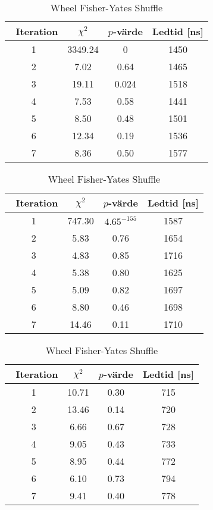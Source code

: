 \begin{table}[H]
	\vspace{2em}

	\begin{subtable}[h]{0.45\textwidth}
		\centering
		\caption{\gls{soc} Pile Shuffle}
		\label{tab:soc}
		\begin{tabular}{c|c|c|c}
			$\phantom{\bigg|}$ Iteration & $\chi^2$  & \(p\)-värde & Ledtid [ns]

			\\ \hline \hline
			1 & 3349.24 & 0 & 1450 
			\\ \hline
			2 & 7.02 & 0.64 & 1465 
			\\ \hline
			3 & 19.11 & 0.024 & 1518
			\\ \hline
			4 & 7.53 & 0.58 & 1441 
			\\ \hline
			5 & 8.50 & 0.48 & 1501 
			\\ \hline
			6 & 12.34 & 0.19 & 1536 
			\\ \hline
			7 & 8.36 & 0.50 & 1577 
		\end{tabular}
	\end{subtable}
	\hfill
	\begin{subtable}[h]{0.45\textwidth}
		\centering
		\caption{Ten Pile Shuffle}
		\label{tab:ten}
		\begin{tabular}{c|c|c|c}
			$\phantom{\bigg|}$ Iteration & $\chi^2$  & \(p\)-värde & Ledtid [ns]

			\\ \hline \hline
			1 & 747.30 & $4.65^{-155}$ & 1587 
			\\ \hline
			2 & 5.83 & 0.76 & 1654 
			\\ \hline
			3 & 4.83 & 0.85 & 1716
			\\ \hline
			4 & 5.38 & 0.80 & 1625 
			\\ \hline
			5 & 5.09 & 0.82 & 1697 
			\\ \hline
			6 & 8.80 & 0.46 & 1698 
			\\ \hline
			7 & 14.46 & 0.11 & 1710 
		\end{tabular}
	\end{subtable}
	\vspace{2em}

	\begin{subtable}[h]{0.45\textwidth}
		\centering
		\caption{Wheel Fisher-Yates Shuffle}
		\label{tab:wheel}
		\begin{tabular}{c|c|c|c}
			$\phantom{\bigg|}$ Iteration & $\chi^2$  & \(p\)-värde & Ledtid [ns]

			\\ \hline \hline
			1 & 10.71 & 0.30 & 715 
			\\ \hline
			2 & 13.46 & 0.14 & 720 
			\\ \hline
			3 & 6.66 & 0.67 & 728
			\\ \hline
			4 & 9.05 & 0.43 & 733 
			\\ \hline
			5 & 8.95 & 0.44 & 772 
			\\ \hline
			6 & 6.10 & 0.73 & 794 
			\\ \hline
			7 & 9.41 & 0.40 & 778 
		\end{tabular}
	\end{subtable}
\end{table}
